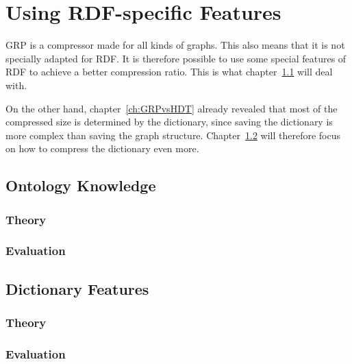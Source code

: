 \chapter{Using RDF-specific Features}\label{ch:rdfSpecificFeatures}

GRP is a compressor made for all kinds of graphs. This also means that it is not specially adapted for RDF. It is therefore possible to use some special features of RDF to achieve a better compression ratio. This is what chapter~\ref{sec:ontKnowledge} will deal with.

On the other hand, chapter~\ref{ch:GRPvsHDT} already revealed that most of the compressed size is determined by the dictionary, since saving the dictionary is more complex than saving the graph structure. Chapter~\ref{sec:dictFeatures} will therefore focus on how to compress the dictionary even more.

\section{Ontology Knowledge}\label{sec:ontKnowledge}


\subsection{Theory}



\subsection{Evaluation}\label{sec:evalOntology}

\section{Dictionary Features}\label{sec:dictFeatures}



\subsection{Theory}












\subsection{Evaluation}\label{sec:evalDict}



